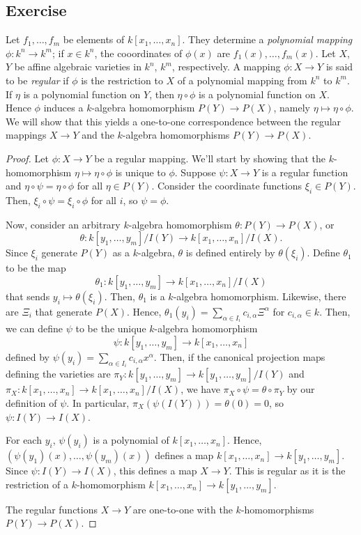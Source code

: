 \subsection{Exercise}\label{1.28}

Let $f_1, \ldots, f_m$ be elements of $k[x_1,\ldots,x_n]$. They determine a {\it polynomial mapping} $\phi : k^n \to k^m$; if $x \in k^n$, the cooordinates of $\phi(x)$ are $f_1(x),\ldots,f_m(x)$.
Let $X$, $Y$ be affine algebraic varieties in $k^n$, $k^m$, respectively. A mapping $\phi : X \to Y$ is said to be {\it regular} if $\phi$ is the restriction to $X$ of a polynomial mapping from
$k^n$ to $k^m$. If $\eta$ is a polynomial function on $Y$, then $\eta \circ \phi$ is a polynomial function on $X$. Hence $\phi$ induces a $k$-algebra homomorphism $P(Y) \to P(X)$, namely $\eta \mapsto \eta \circ \phi$.
We will show that this yields a one-to-one correspondence between the regular mappings $X \to Y$ and the $k$-algebra homomorphisms $P(Y) \to P(X)$.

\begin{proof}
Let $\phi : X \to Y$ be a regular mapping. We'll start by showing that the $k$-homomorphism $\eta \mapsto \eta \circ \phi$ is unique to $\phi$. Suppose $\psi : X \to Y$ is a regular function and
$\eta \circ \psi = \eta \circ \phi$ for all $\eta \in P(Y)$. Consider the coordinate functions $\xi_i \in P(Y)$. Then, $\xi_i \circ \psi = \xi_i \circ \phi$ for all $i$, so $\psi = \phi$.

Now, consider an arbitrary $k$-algebra homomorphism $\theta: P(Y) \to P(X)$, or
$$\theta: k[y_1,\ldots,y_m]/I(Y) \to k[x_1,\ldots,x_n]/I(X).$$
Since $\xi_i$ generate $P(Y)$ as a $k$-algebra, $\theta$ is defined entirely by $\theta(\xi_i)$. Define $\theta_1$ to be the map
$$\theta_1: k[y_1,\ldots,y_m] \to k[x_1,\ldots,x_n]/I(X)$$
that sends $y_i \mapsto \theta(\xi_i)$. Then, $\theta_1$ is a $k$-algebra homomorphism. Likewise, there are $\Xi_i$ that generate $P(X)$. Hence, 
$\theta_1(y_i) = \sum_{\alpha \in I_i}c_{i,\alpha}\Xi^{\alpha}$ for $c_{i,\alpha} \in k$. Then, we can define $\psi$ to be the unique $k$-algebra homomorphism
$$\psi : k[y_1,\ldots,y_m] \to k[x_1,\ldots,x_n]$$
defined by $\psi(y_i) = \sum_{\alpha \in I_i}c_{i,\alpha}x^{\alpha}$. Then, if the canonical projection maps defining the varieties are $\pi_Y:k[y_1,\ldots,y_m] \to k[y_1,\ldots,y_m] /I(Y)$ and 
$\pi_X : k[x_1,\ldots,x_n] \to k[x_1,\ldots,x_n]/I(X)$, we have $\pi_X \circ \psi = \theta \circ \pi_Y$ by our definition of $\psi$. In particular, $\pi_X(\psi(I(Y))) = \theta(0) = 0$, so $\psi : I(Y) \to I(X)$. 

For each $y_i$, $\psi(y_i)$ is a polynomial of $k[x_1,\ldots,x_n]$. Hence, $(\psi(y_1)(x),\ldots,\psi(y_m)(x))$ defines a map $k[x_1,\ldots,x_n] \to k[y_1,\ldots,y_m]$. Since
$\psi : I(Y) \to I(X)$, this defines a map $X \to Y$. This is regular as it is the restriction of a $k$-homomorphism $k[x_1,\ldots,x_n] \to k[y_1,\ldots,y_m]$.

The regular functions $X \to Y$ are one-to-one with the $k$-homomorphisms $P(Y) \to P(X)$.
\end{proof}
